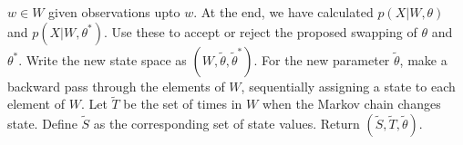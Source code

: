 \begin{algorithm}[H]
\begin{algorithmic}[1]
    $w \in W$ given observations upto $w$. At the end, we have calculated
    $p(X|W,\theta)$ and $p(X|W,\theta^*)$. Use these to accept or reject the
    proposed swapping of $\theta$ and $\theta^*$. Write the new state space
    as $(W,\tilde{\theta},\tilde{\theta}^*)$.
    \State For the new parameter $\tilde{\theta}$, make a backward pass through 
    the elements of
    $W$, sequentially assigning a state to each element of $W$.
    \State Let $\tilde{T}$ be the set of times in $W$ when the Markov chain changes state. Define $\tilde{S}$ as the corresponding set of state values. Return $(\tilde{S}, \tilde{T}, \tilde{\theta})$.
\end{algorithmic}
\end{algorithm}

